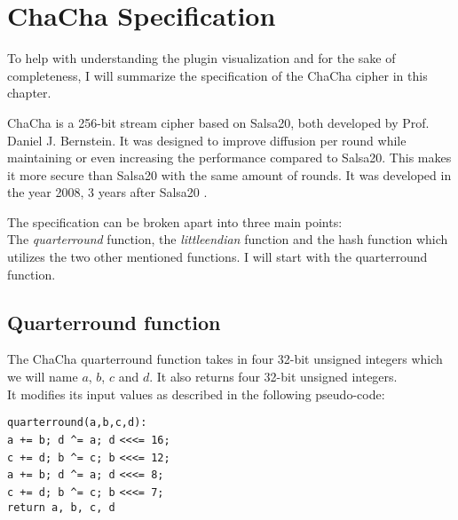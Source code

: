 \chapter{ChaCha Specification}
\label{chap:chacha}

To help with understanding the plugin visualization and for the sake of completeness, I will summarize the specification of the ChaCha cipher in this chapter.

ChaCha is a 256-bit stream cipher based on Salsa20, both developed by Prof. Daniel J. Bernstein. It was designed to improve diffusion per round while maintaining or even increasing the performance compared to Salsa20. This makes it more secure than Salsa20 with the same amount of rounds. It was developed in the year 2008, 3 years after Salsa20 \cite{chachaspec}.

The specification can be broken apart into three main points: \\
The \textit{quarterround} function, the \textit{littleendian} function and the hash function which utilizes the two other mentioned functions. I will start with the quarterround function.

\section{Quarterround function}
\label{sec:chacha.qr}

The ChaCha quarterround function takes in four 32-bit unsigned integers which we will name $a$, $b$, $c$ and $d$. It also returns four 32-bit unsigned integers.\\
It modifies its input values as described in the following pseudo-code:

\begin{center}
\begin{minipage}{0.5\linewidth}
\texttt{quarterround(a,b,c,d):} \\
\hspace*{1em}\texttt{a += b; d  \^{}= a; d} \verb|<<<|\texttt{= 16;} \\
\hspace*{1em}\texttt{c += d; b \^{}= c; b} \verb|<<<|\texttt{= 12;} \\
\hspace*{1em}\texttt{a += b; d \^{}= a; d} \verb|<<<|\texttt{= 8;} \\
\hspace*{1em}\texttt{c += d; b \^{}= c; b} \verb|<<<|\texttt{= 7;} \\
\hspace*{1em}\texttt{return a, b, c, d}
\end{minipage}
\end{center}

